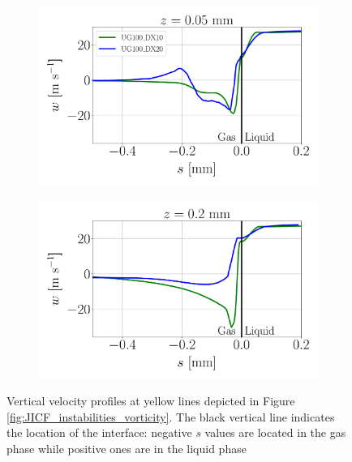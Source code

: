 \begin{figure}[ht]
\flushleft
\begin{subfigure}[b]{0.45\textwidth}
	\flushleft
   \includegraphics[scale=0.25]{./part2_developments/figures_ch5_resolved_JICF/instabilities_resolution/line_data_outside_injector_z_low}
\end{subfigure}
\hfill
\begin{subfigure}[b]{0.45\textwidth}
	\flushleft
   \includegraphics[scale=0.25]{./part2_developments/figures_ch5_resolved_JICF/instabilities_resolution/line_data_outside_injector_z_upper}
\end{subfigure}

   \caption[Vertical velocity profiles at yellow lines depicted in Figure \ref{fig:JICF_instabilities_vorticity}]{Vertical velocity profiles at yellow lines depicted in Figure \ref{fig:JICF_instabilities_vorticity}. The black vertical line indicates the location of the interface: negative $s$ values are located in the gas phase while positive ones are in the liquid phase}
\label{fig:jicf_data_lines_outside_injector}
\end{figure}

